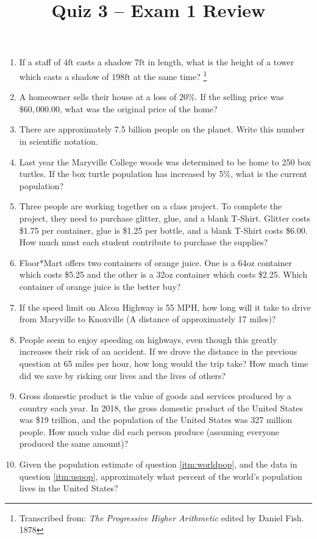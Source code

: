 \documentclass{article}
\title{Quiz 3 -- Exam 1 Review}
\date{}
\begin{document}
\maketitle

\begin{enumerate}
  \item If a staff of $4\mathrm{ft}$ casts a shadow $7\mathrm{ft}$ in length,
      what is the height of a tower which casts a shadow of $198\mathrm{ft}$ at
      the same time? \footnote{Transcribed from: {\em The Progressive Higher
      Arithmetic} edited by Daniel Fish. 1878\label{fn:higher}}
  \item A homeowner sells their house at a loss of $20\%$. If the selling
      price was $\$60,000.00$, what was the original price of the home?
  \item There are approximately 7.5 billion people on the planet. Write this
      number in scientific notation.\label{itm:worldpop}
  \item Last year the Maryville College woods was determined to be home to
      250 box turtles. If the box turtle population has increased by 5\%, what is
      the current population?
  \item Three people are working together on a class project. To complete the
      project, they need to purchase glitter, glue, and a blank T-Shirt. Glitter
      costs \$1.75 per container, glue is \$1.25 per bottle, and a blank T-Shirt
      costs \$6.00. How much must each student contribute to purchase the
      supplies?
  \item Floor*Mart offers two containers of orange juice. One is a 64oz
      container which costs \$5.25 and the other is a 32oz container which costs
      \$2.25. Which container of orange juice is the better buy?
  \item If the speed limit on Alcoa Highway is 55 MPH, how long will it take
      to drive from Maryville to Knoxville (A distance of approximately 17
      miles)?
  \item People seem to enjoy speeding on highways, even though this greatly
      increases their risk of an accident. If we drove the distance in the
      previous question at 65 miles per hour, how long would the trip take? How
      much time did we save by risking our lives and the lives of others?
  \item Gross domestic product is the value of goods and services produced by
      a country each year. In 2018, the gross domestic product of the United
      States was \$19 trillion, and the population of the United States was 327
      million people. How much value did each person produce (assuming everyone
      produced the same amount)? \label{itm:uspop}
  \item Given the population estimate of question \ref{itm:worldpop}, and the
      data in question \ref{itm:uspop}, approximately what percent of the world's
      population lives in the United States?
\end{enumerate}
\end{document}
